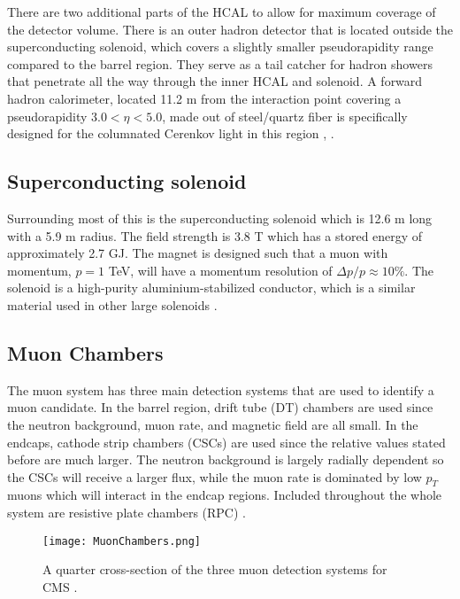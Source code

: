 There are two additional parts of the HCAL to allow for maximum coverage of the detector volume. There is an outer hadron detector that is located outside the superconducting solenoid, which covers a slightly smaller pseudorapidity range compared to the barrel region. They serve as a tail catcher for hadron showers that penetrate all the way through the inner HCAL and solenoid. A forward hadron calorimeter, located 11.2 m from the interaction point covering a pseudorapidity $3.0<\eta<5.0$, made out of steel/quartz fiber is specifically designed for the columnated Cerenkov light in this region \cite{noauthor_cms_1997-1}, \cite{collaboration_cms_2007}. 

\subsection{Superconducting solenoid}
\label{sec:Solenoid}

Surrounding most of this is the superconducting solenoid which is 12.6 m long with a 5.9 m radius. The field strength is 3.8 T which has a stored energy of approximately 2.7 GJ. The magnet is designed such that a muon with momentum, $p=1$ TeV, will have a momentum resolution of $\Delta p/p\approx10\%$. The solenoid is a high-purity aluminium-stabilized conductor, which is a similar material used in other large solenoids \cite{collaboration_cms_2007}. 

\subsection{Muon Chambers}
\label{sec:muCham}

The muon system has three main detection systems that are used to identify a muon candidate. In the barrel region, drift tube (DT) chambers are used since the neutron background, muon rate, and magnetic field are all small. In the endcaps, cathode strip chambers (CSCs) are used since the relative values stated before are much larger. The neutron background is largely radially dependent so the CSCs will receive a larger flux, while the muon rate is dominated by low $p_T$ muons which will interact in the endcap regions. Included throughout the whole system are resistive plate chambers (RPC) \cite{collaboration_cms_2007}. 

\begin{figure}
 	\centering
	\texttt{[image: MuonChambers.png]}
 	\caption[Muon Chambers]{A quarter cross-section of the three muon detection systems for CMS \cite{collaboration_cms_2007}.}
 	\label{MuonChambers} 
\end{figure}

